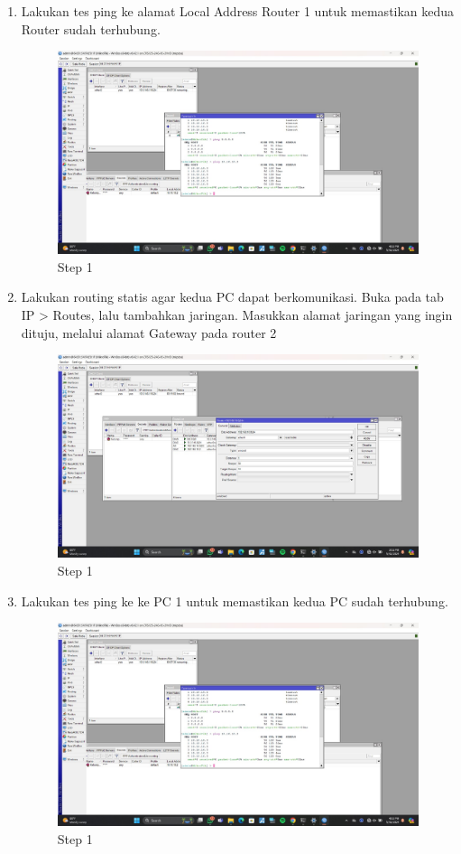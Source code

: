 \begin{enumerate}
	\item Lakukan tes ping ke alamat Local Address Router 1 untuk memastikan kedua Router sudah
	terhubung.
	
	\begin{figure}[H]
		\centering
		\includegraphics[width=0.5\linewidth]{P4/img/2step6.jpg}
		\caption{Step 1}
		\label{fig:gambar1}
	\end{figure}

	\item Lakukan routing statis agar kedua PC dapat berkomunikasi. Buka pada tab IP > Routes, lalu
	tambahkan jaringan. Masukkan alamat jaringan yang ingin dituju, melalui alamat Gateway pada
	router 2
	
	\begin{figure}[H]
		\centering
		\includegraphics[width=0.5\linewidth]{P4/img/2step7.jpg}
		\caption{Step 1}
		\label{fig:gambar1}
	\end{figure}

	\item Lakukan tes ping ke ke PC 1 untuk memastikan kedua PC sudah terhubung.
	
	\begin{figure}[H]
		\centering
		\includegraphics[width=0.5\linewidth]{P4/img/2step6.jpg}
		\caption{Step 1}
		\label{fig:gambar1}
	\end{figure}

\end{enumerate}


